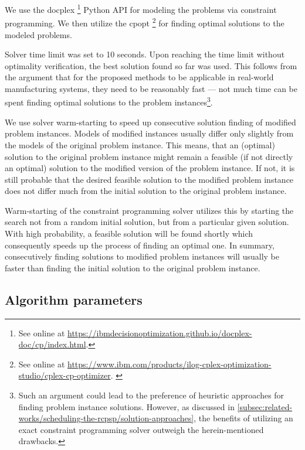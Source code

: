 We use the \ac{docplex}%
\footnote{See online at \url{https://ibmdecisionoptimization.github.io/docplex-doc/cp/index.html}.}
Python API for modeling the problems via constraint programming.
We then utilize the \ac{cpopt}%
\footnote{See online at \url{https://www.ibm.com/products/ilog-cplex-optimization-studio/cplex-cp-optimizer}. \citep{WEB_IBM_CPLEX}}
for finding optimal solutions to the modeled problems.

Solver time limit was set to 10 seconds.
Upon reaching the time limit without optimality verification,
the best solution found so far was used.
This follows from the argument that for the proposed methods
to be applicable in real-world manufacturing systems,
they need to be reasonably fast
--- not much time can be spent finding optimal solutions to the problem instances\footnote{
    Such an argument could lead to the preference of heuristic approaches for finding problem instance solutions.
    However, as discussed in \cref{subsec:related-works/scheduling-the-rcpsp/solution-approaches},
    the benefits of utilizing an exact constraint programming solver outweigh the herein-mentioned drawbacks.
    }.

We use solver warm-starting to speed up consecutive solution finding of modified problem instances.
Models of modified instances usually differ only slightly from the models of the original problem instance.
This means, that an (optimal) solution to the original problem instance
might remain a feasible (if not directly an optimal) solution to the modified version of the problem instance.
If not, it is still probable that the desired feasible solution to the modified problem instance
does not differ much from the initial solution to the original problem instance.

Warm-starting of the constraint programming solver utilizes this
by starting the search not from a random initial solution, but from a particular given solution.
With high probability, a feasible solution will be found shortly
which consequently speeds up the process of finding an optimal one.
In summary, consecutively finding solutions to modified problem instances will usually be faster
than finding the initial solution to the original problem instance.

\subsection{Algorithm parameters} \label{subsec:numerical-experiments/setup/algorithm-parameters}

